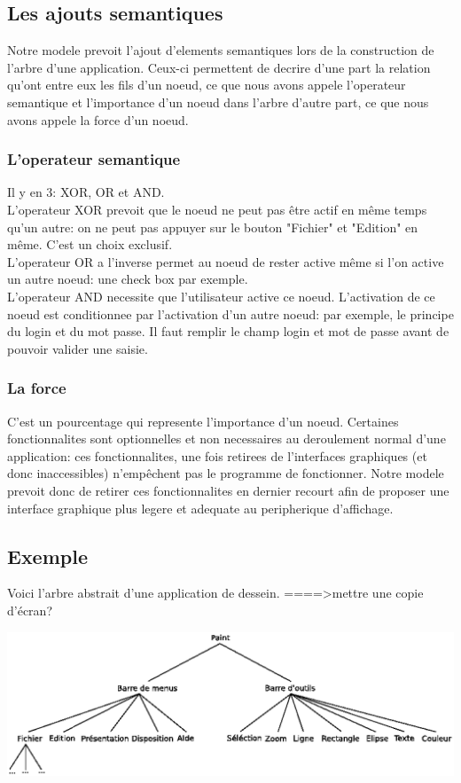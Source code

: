 \documentclass[fleqn]{article-hermes}
\begin{document}
\subsection{Les ajouts semantiques}
Notre modele prevoit l'ajout d'elements semantiques lors de la construction de l'arbre d'une application. Ceux-ci permettent de decrire d'une part la relation qu'ont entre eux les fils d'un noeud, ce que nous avons appele l'operateur semantique et l'importance d'un noeud dans l'arbre d'autre part, ce que nous avons appele la force d'un noeud.
\subsubsection{L'operateur semantique}
Il y en 3: XOR, OR et AND.\\
L'operateur XOR prevoit que le noeud ne peut pas être actif en même temps qu'un autre: on ne peut pas appuyer sur le bouton "Fichier" et "Edition" en même. C'est un choix exclusif.\\
L'operateur OR a l'inverse permet au noeud de rester active même si l'on active un autre noeud: une check box par exemple.\\
L'operateur AND necessite que l'utilisateur active ce noeud. L'activation de ce noeud est conditionnee par l'activation d'un autre noeud: par exemple, le principe du login et du mot passe. Il faut remplir le champ login et mot de passe avant de pouvoir valider une saisie.
\subsubsection{La force}
C'est un pourcentage qui represente l'importance d'un noeud. Certaines fonctionnalites sont optionnelles et non necessaires au deroulement normal d'une application: ces fonctionnalites, une fois retirees de l'interfaces graphiques (et donc inaccessibles) n'empêchent pas le programme de fonctionner. Notre modele prevoit donc de retirer ces fonctionnalites en dernier recourt afin de proposer une interface graphique plus legere et adequate au peripherique d'affichage.
\subsection{Exemple}
Voici l'arbre abstrait d'une application de dessein.
====>mettre une copie d'écran?
\begin{center}
\includegraphics[scale=0.8]{figures/arbre_abstrait.ps}
\end{center}
\end{document}
